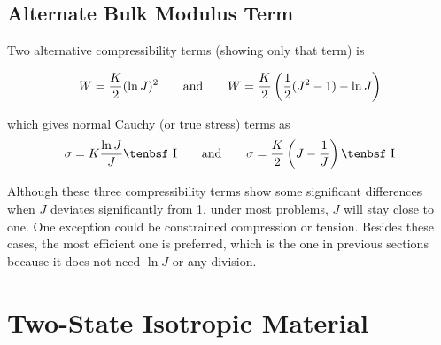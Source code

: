 \documentclass[11pt]{article}
\def\I{\hbox{\tenbsf I}}
\begin{document}
\subsection{Alternate Bulk Modulus Term}

Two alternative compressibility terms (showing only that term) is

\begin{equation}
W = {K\over2}(\ln J)^2  \qquad{\rm and}\qquad W = {K\over2}\left({1\over2}(J^2-1) - \ln J\right)
\end{equation}

\noindent which gives normal Cauchy (or true stress) terms as
\begin{equation}
     \sigma = K {\ln J\over J}\I  \qquad{\rm and}\qquad \sigma = {K\over 2}\left(J-{1\over J}\right)\I
\end{equation}

\noindent Although these three compressibility terms show some significant differences when $J$ deviates significantly from 1, under most problems, $J$ will stay close to one. One exception could be constrained compression or tension. Besides these cases, the most efficient one is preferred, which is the one in previous sections because it does not need $\ln J$ or any division.

\section{Two-State Isotropic Material}
\end{document}
